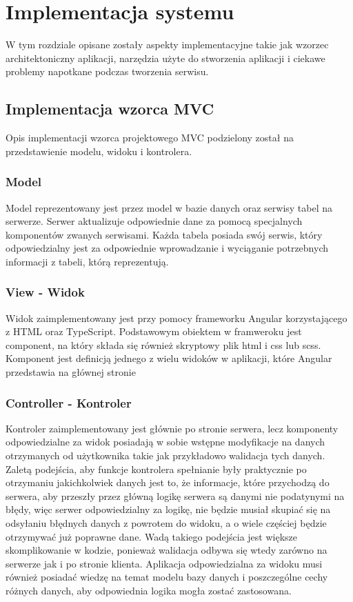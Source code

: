 \chapter{Implementacja systemu}
\thispagestyle{chapterBeginStyle}
W tym rozdziale opisane zostały aspekty implementacyjne takie jak wzorzec architektoniczny aplikacji, narzędzia użyte do stworzenia aplikacji  i ciekawe problemy napotkane podczas tworzenia serwisu.
\section{Implementacja  wzorca  MVC}
Opis implementacji wzorca projektowego MVC podzielony został na przedstawienie modelu, widoku i kontrolera.
\subsection{Model}
Model reprezentowany jest przez model w bazie danych oraz serwisy tabel  na serwerze.
Serwer aktualizuje odpowiednie dane za pomocą specjalnych komponentów zwanych serwisami. Każda tabela posiada swój serwis, który odpowiedzialny jest za odpowiednie wprowadzanie i wyciąganie potrzebnych informacji z tabeli, którą reprezentują.
\subsection{View - Widok}
Widok zaimplementowany jest przy pomocy frameworku Angular korzystającego z HTML oraz TypeScript. Podstawowym obiektem w framweroku jest component,  na który składa się również skryptowy plik html i css lub scss. Komponent jest definicją jednego z wielu widoków w aplikacji, które Angular przedstawia na głównej stronie 
\subsection{Controller - Kontroler}
Kontroler zaimplementowany jest głównie po stronie serwera, lecz komponenty odpowiedzialne za widok posiadają w sobie wstępne modyfikacje na danych otrzymanych od użytkownika takie jak przykładowo walidacja tych danych. Zaletą podejścia, aby funkcje kontrolera spełnianie były praktycznie po otrzymaniu jakichkolwiek danych jest to, że informacje, które przychodzą do serwera, aby przeszły przez główną logikę serwera są danymi nie podatynymi na błędy, więc serwer odpowiedzialny za logikę, nie będzie musiał skupiać się na odsyłaniu błędnych danych z powrotem do widoku, a o wiele częściej będzie otrzymywać już poprawne dane. Wadą takiego podejścia jest większe skomplikowanie w kodzie, ponieważ walidacja odbywa się wtedy zarówno na serwerze jak i po stronie klienta. Aplikacja odpowiedzialna za widoku musi również posiadać wiedzę na temat modelu bazy danych i poszczególne cechy różnych danych, aby odpowiednia logika mogła zostać zastosowana.

